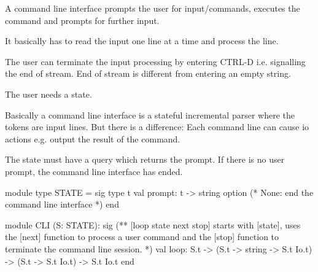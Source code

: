 A command line interface prompts the user for input/commands, executes the
command and prompts for further input.

It basically has to read the input one line at a time and process the line.

The user can terminate the input processing by entering CTRL-D i.e. signalling
the end of stream. End of stream is different from entering an empty string.

The user needs a state.

Basically a command line interface is a stateful incremental parser where the
tokens are input lines. But there is a difference: Each command line can cause
io actions e.g. output the result of the command.

The state must have a query which returns the prompt. If there is no user
prompt, the command line interface has ended.

\begin{ocaml}
  module type STATE =
  sig
    type t
    val prompt: t -> string option (* None: end the command line interface *)
  end

  module CLI (S: STATE):
  sig
    (** [loop state next stop] starts with [state], uses the [next] function
        to process a user command and the [stop] function to terminate the
        command line session. *)
    val loop: S.t -> (S.t -> string -> S.t Io.t) -> (S.t -> S.t Io.t) -> S.t Io.t
  end
\end{ocaml}




